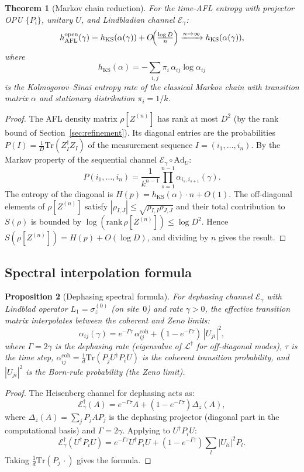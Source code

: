\documentclass[12pt,a4paper]{article}
\newtheorem{theorem}{Theorem}[section]
\newtheorem{proposition}[theorem]{Proposition}
\begin{document}
\begin{theorem}[Markov chain reduction]
\label{thm:markov_reduction}
For the time-AFL entropy with projector OPU $\{P_i\}$, unitary $U$, and
Lindbladian channel $\mathcal{E}_\gamma$:
\[
  h_{\mathrm{AFL}}^{\mathrm{open}}(\gamma)
  = h_{\mathrm{KS}}(\alpha(\gamma))
    + O\!\Bigl(\tfrac{\log D}{n}\Bigr)
  \xrightarrow{n\to\infty}
  h_{\mathrm{KS}}(\alpha(\gamma)),
\]
where
\[
  h_{\mathrm{KS}}(\alpha)
  = -\sum_{i,j} \pi_i\,\alpha_{ij}\log\alpha_{ij}
\]
is the Kolmogorov--Sinai entropy rate of the classical Markov chain with
transition matrix $\alpha$ and stationary distribution $\pi_i = 1/k$.
\end{theorem}
\begin{proof}
The AFL density matrix $\rho[Z^{(n)}]$ has rank at most $D^2$ (by the rank
bound of Section~\ref{sec:refinement}).  Its diagonal entries are the
probabilities $P(I) = \tfrac{1}{D}\mathrm{Tr}(Z_I^\dagger Z_I)$ of the
measurement sequence $I = (i_1,\ldots,i_n)$.  By the Markov property of
the sequential channel $\mathcal{E}_\gamma\circ\mathrm{Ad}_U$:
\[
  P(i_1,\ldots,i_n)
  = \frac{1}{k^{n-1}}\prod_{s=1}^{n-1}\alpha_{i_s,i_{s+1}}(\gamma).
\]
The entropy of the diagonal is $H(p) = h_{\mathrm{KS}}(\alpha)\cdot n + O(1)$.
The off-diagonal elements of $\rho[Z^{(n)}]$ satisfy
$|\rho_{I,J}| \leq \sqrt{\rho_{I,I}\rho_{J,J}}$ and their total contribution
to $S(\rho)$ is bounded by $\log(\mathrm{rank}\,\rho[Z^{(n)}]) \leq \log D^2$.
Hence $S(\rho[Z^{(n)}]) = H(p) + O(\log D)$, and dividing by $n$ gives
the result.
\end{proof}

\subsection{Spectral interpolation formula}

\begin{proposition}[Dephasing spectral formula]
\label{prop:dephasing_spectral}
For dephasing channel $\mathcal{E}_\gamma$ with Lindblad operator
$L_1 = \sigma_z^{(0)}$ (on site~$0$) and rate $\gamma>0$,
the effective transition matrix interpolates between the coherent and
Zeno limits:
\[
  \boxed{
  \alpha_{ij}(\gamma)
  = e^{-\Gamma\tau}\,\alpha_{ij}^{\mathrm{coh}}
    + (1-e^{-\Gamma\tau})\,|U_{ji}|^2,
  }
\]
where $\Gamma = 2\gamma$ is the dephasing rate (eigenvalue of
$\mathcal{L}^\dagger$ for off-diagonal modes), $\tau$ is the time step,
$\alpha_{ij}^{\mathrm{coh}} = \tfrac{1}{d}\mathrm{Tr}(P_j U^\dagger P_i U)$
is the coherent transition probability, and $|U_{ji}|^2$ is the Born-rule
probability (the Zeno limit).
\end{proposition}
\begin{proof}
The Heisenberg channel for dephasing acts as:
\[
  \mathcal{E}_\gamma^\dagger(A)
  = e^{-\Gamma\tau} A + (1-e^{-\Gamma\tau})\Delta_z(A),
\]
where $\Delta_z(A) = \sum_j P_j A P_j$ is the dephasing projector
(diagonal part in the computational basis) and $\Gamma = 2\gamma$.
Applying to $U^\dagger P_i U$:
\[
  \mathcal{E}_\gamma^\dagger(U^\dagger P_i U)
  = e^{-\Gamma\tau} U^\dagger P_i U
    + (1-e^{-\Gamma\tau})\sum_l |U_{li}|^2 P_l.
\]
Taking $\frac{1}{d}\mathrm{Tr}(P_j\,\cdot)$ gives the formula.
\end{proof}
\end{document}
